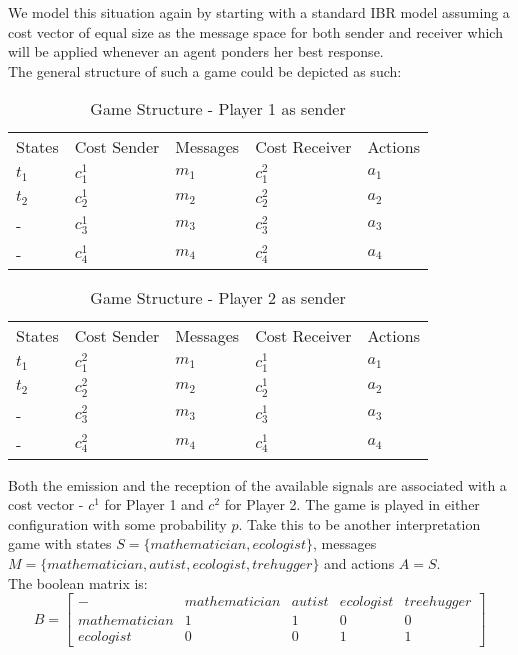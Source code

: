 \documentclass{article}
\begin{document}
We model this situation again by starting with a standard IBR model assuming a cost vector of equal size as the message space for both sender and receiver which will be applied whenever an agent ponders her best response. \\
The general structure of such a game could be depicted as such: %
\begin{table}[h]
\centering
\caption{Game Structure - Player 1 as sender}
\label{my-label}
\begin{tabular}{lllll}
States & Cost Sender & Messages & Cost Receiver & Actions \\
$t_1$  & $c^1_1$      & $m_1$    & $c^2_1$        & $a_1$   \\
$t_2$  & $c^1_2$      & $m_2$    & $c^2_2$        & $a_2$  \\
- & $c^1_3$ 		&$m_3$	& $c^2_3$		& $a_3$ \\
- & $c^1_4$ 		&$m_4$	& $c^2_4$		& $a_4$
\end{tabular}
\end{table}
\begin{table}[h]
\centering
\caption{Game Structure - Player 2 as sender}
\label{my-label}
\begin{tabular}{lllll}
States & Cost Sender & Messages & Cost Receiver & Actions \\
$t_1$  & $c^2_1$      & $m_1$    & $c^1_1$        & $a_1$   \\
$t_2$  & $c^2_2$      & $m_2$    & $c^1_2$        & $a_2$  \\
- & $c^2_3$ 		&$m_3$	& $c^1_3$		& $a_3$ \\
- & $c^2_4$ 		&$m_4$	& $c^1_4$		& $a_4$
\end{tabular}
\end{table}

Both the emission and the reception of the available signals are associated with a cost vector - $c^1$ for Player 1 and $c^2$ for Player 2. The game is played in either configuration with some probability $p$. Take this to be another interpretation game with states $S=\{mathematician, ecologist\}$, messages $M=\{mathematician,autist,ecologist,trehugger\}$ and actions $A=S$.\\
The boolean matrix is:
\begin{equation*}
B=
\begin{bmatrix}
- & mathematician & autist & ecologist & treehugger \\
mathematician  & 1      & 1    & 0        & 0   \\
ecologist  & 0     & 0   & 1       & 1 
\end{bmatrix}
\end{equation*}
\end{document}
